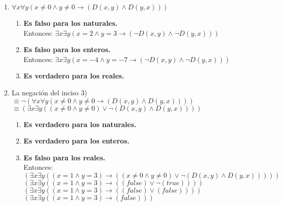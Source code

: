 \documentclass[a4paper,10pt]{article}
\begin{document}
\begin{enumerate}
\begin{enumerate}[label=\arabic*)]
    \item $\forall x \forall y \left(x \neq 0 \wedge y\neq 0 \to \left(D\left(x,y\right) \wedge D\left(y,x\right)\right)\right)$
    \begin{enumerate}[label=\alph*)]
      \item \textbf{Es falso para los naturales.}\\
      Entonces: $\exists x \exists y (x = 2 \wedge y = 3 \to (\neg D(x,y) \wedge \neg D(y,x)))$
      \item \textbf{Es falso para los enteros.}\\
      Entonces: $\exists x \exists y (x = -4 \wedge y = -7 \to (\neg D(x,y) \wedge \neg D(y,x)))$
      \item \textbf{Es verdadero para los reales.}\\
      
    \end{enumerate}

    \item La negaci\'on del inciso 3)\\
    $\equiv \neg (\forall x \forall y (x\neq 0 \wedge y \neq 0 \to (D(x,y) \wedge D(y,x))))$\\
    $\equiv (\exists x \exists y ((x\neq 0 \wedge y \neq 0) \lor \neg (D(x,y) \wedge D(y,x))))$\\
    
    \begin{enumerate}[label=\alph*)]
      \item \textbf{Es verdadero para los naturales.}
      \item \textbf{Es verdadero para los enteros.}
      \item \textbf{Es falso para los reales.}\\
      Entonces:\\
      $(\exists x \exists y ((x = 1 \wedge y = 3) \to ((x\neq 0 \wedge y \neq 0) \lor \neg (D(x,y) \wedge D(y,x)))))$\\
      $(\exists x \exists y ((x = 1 \wedge y = 3) \to ((false) \lor \neg (true))))$\\
      $(\exists x \exists y ((x = 1 \wedge y = 3) \to ((false) \lor (false))))$\\
      $(\exists x \exists y ((x = 1 \wedge y = 3) \to (false)))$\\

    \end{enumerate}

  \end{enumerate}


\end{enumerate}
\end{document}
